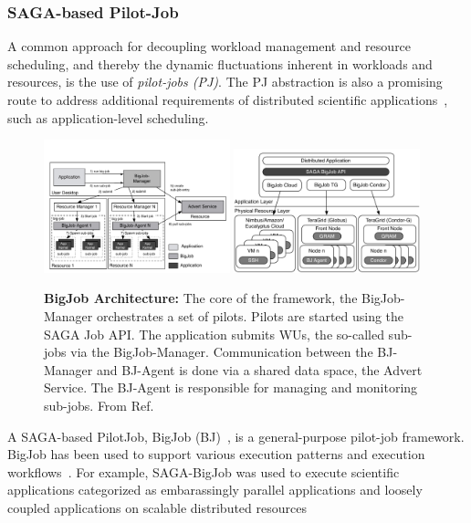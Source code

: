 \documentclass[]{svjour3}
\begin{document}
\subsubsection{SAGA-based Pilot-Job}

A common approach for decoupling workload management and resource
scheduling, and thereby the dynamic fluctuations inherent in workloads
and resources, is the use of \emph{pilot-jobs (PJ)}. The PJ abstraction is also a
promising route to address additional requirements of distributed scientific
applications~\cite{ko-efficient,bigjob_cloudcom10}, such as application-level scheduling.
 
\begin{figure}[t]
 \centering
  \includegraphics[width=0.48\textwidth]{figures/re_bigjob_interactions.pdf}
 \includegraphics[width=0.48\textwidth]{figures/distributed_pilot_job.pdf}

    \caption{\textbf{BigJob Architecture:} The core of the
     framework, the BigJob-Manager orchestrates a set of
     pilots. Pilots are started using the SAGA Job API. The
     application submits WUs, the so-called sub-jobs via the
     BigJob-Manager. Communication between the BJ-Manager and
     BJ-Agent is done via a shared data space, the Advert
     Service. The BJ-Agent is responsible for managing and
     monitoring sub-jobs. From
     Ref.~\cite{saga_bigjob_condor_cloud}}
    \label{fig:figures_re_bigjob_interactions}
\end{figure}

A SAGA-based PilotJob, BigJob (BJ)~\cite{bigjob_web,saga_bigjob_condor_cloud}, is a
general-purpose pilot-job framework. BigJob has been used to support various
execution patterns and execution workflows~\cite{async_repex11,saga-royalsoc}.
For example, SAGA-BigJob was used to execute scientific
applications categorized as embarassingly parallel applications and
loosely coupled applications on scalable distributed
resources~\cite{ecmls_ccpe10, dare-ecmls11}
\end{document}

